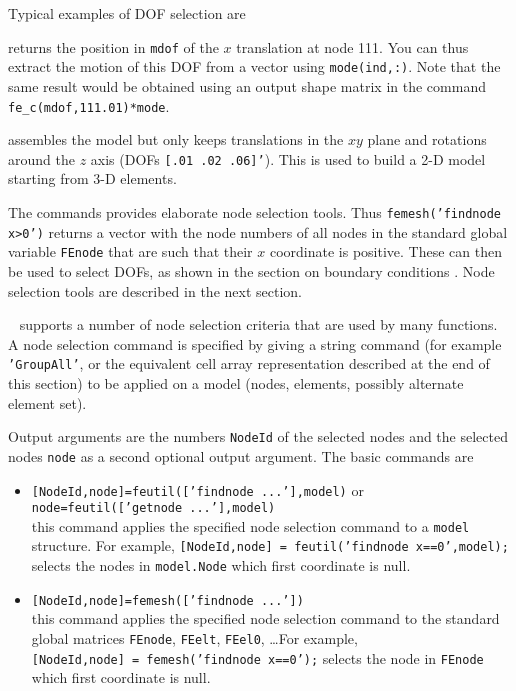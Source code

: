 \lvs Typical examples of DOF selection are 

 returns the position in {\tt mdof} of the $x$ translation at node 111. You can thus extract the motion of this DOF from a vector using {\tt mode(ind,:)}. Note that the same result would be obtained using an output shape matrix in the command {\tt fe\_c(mdof,111.01)*mode}.


assembles the model but only keeps translations in the $xy$ plane and rotations around the $z$ axis (DOFs {\tt [.01 .02 .06]'}). This is used to build a 2-D model starting from 3-D elements.

\lvs The  commands provides elaborate node selection tools. Thus {\tt femesh('findnode x>0')} returns a vector with the node numbers of all nodes in the standard global variable {\tt FEnode} that are such that their $x$ coordinate is positive. These can then be used to select DOFs, as shown in the section on boundary conditions . Node selection tools are described in the next section.

\newpage


\feutil\  supports a number of node selection criteria that are used by many functions. A node selection command is specified by giving a string command (for example {\tt 'GroupAll'}, or the equivalent cell array representation described at the end of this section) to be applied on a model (nodes, elements, possibly alternate element set).

Output arguments are the numbers {\tt NodeId} of the selected nodes and the selected nodes {\tt node} as a second optional output argument. The basic commands are  
\begin{itemize}
\item {\tt [NodeId,node]=feutil(['findnode ...'],model)} or {\tt node=feutil(['getnode ...'],model)}\\
this command applies the specified node selection command to a {\tt model} structure. For example,
{\tt [NodeId,node] = feutil('findnode x==0',model);} \\selects the nodes in {\tt model.Node} which first coordinate is null.

\item {\tt [NodeId,node]=femesh(['findnode ...'])}\\
this command applies the specified node selection command to the standard global matrices {\tt FEnode}, {\tt FEelt}, {\tt FEel0}, \ldots For example,\\
{\tt [NodeId,node] = femesh('findnode x==0');}
selects the node in {\tt FEnode} which first coordinate is null.
\end{itemize}

